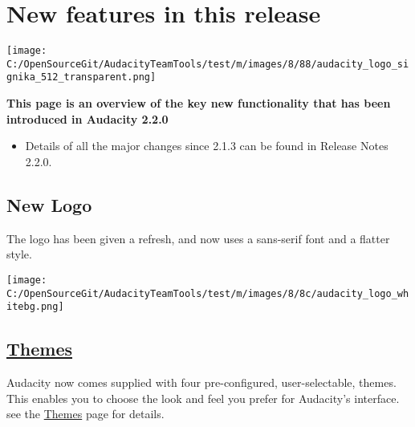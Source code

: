 \label{newXfeaturesXinXthisXreleaseX}
\chapter{New features in this release}\begin{multicols}{2}\par \protect\texttt{[image: C:/OpenSourceGit/AudacityTeamTools/test/m/images/8/88/audacity\_logo\_signika\_512\_transparent.png]}\par \textbf{This page is an overview of the key new functionality that has been introduced in Audacity 2.2.0}
\begin{itemize}
\item Details of all the major changes since 2.1.3 can be found in Release Notes 2.2.0.
\end{itemize}

\label{newXfeaturesXinXthisXreleaseXlogo}
\section{New Logo}The logo has been given a refresh, and now uses a sans-serif font and a flatter style.
\par \protect\texttt{[image: C:/OpenSourceGit/AudacityTeamTools/test/m/images/8/8c/audacity\_logo\_whitebg.png]}\par 
\label{newXfeaturesXinXthisXreleaseXthemes}
\section{
\hyperref[\foo{themesX}]{Themes}
}Audacity now comes supplied with four pre-configured, user-selectable, themes.  This enables you to choose the look and feel you prefer for Audacity's interface. see the 
\hyperref[\foo{themesX}]{Themes}
 page for details.


\end{multicols}
